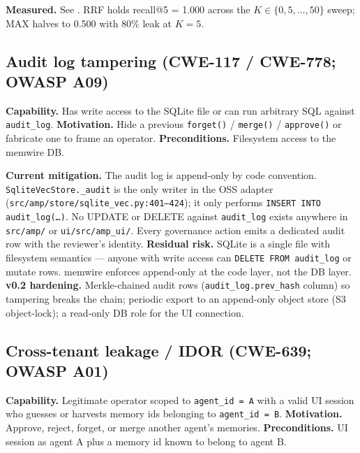 \documentclass[11pt,letterpaper,twocolumn]{article}
\begin{document}
\textbf{Measured.} See . RRF holds recall@5 = 1.000 across the $K \in \{0,5,\dots,50\}$ sweep; MAX halves to 0.500 with 80\% leak at $K=5$.

\subsection{Audit log tampering (CWE-117 / CWE-778; OWASP A09)}
\label{sec:threats-audit}

\textbf{Capability.} Has write access to the SQLite file or can run arbitrary SQL against \texttt{audit\_log}. \textbf{Motivation.} Hide a previous \texttt{forget()} / \texttt{merge()} / \texttt{approve()} or fabricate one to frame an operator. \textbf{Preconditions.} Filesystem access to the memwire DB.

\textbf{Current mitigation.} The audit log is append-only by code convention. \texttt{SqliteVecStore.\_audit} is the only writer in the OSS adapter (\texttt{src/amp/store/sqlite\_vec.py:401--424}); it only performs \texttt{INSERT INTO audit\_log(\ldots)}. No UPDATE or DELETE against \texttt{audit\_log} exists anywhere in \texttt{src/amp/} or \texttt{ui/src/amp\_ui/}. Every governance action emits a dedicated audit row with the reviewer's identity. \textbf{Residual risk.} SQLite is a single file with filesystem semantics --- anyone with write access can \texttt{DELETE FROM audit\_log} or mutate rows. memwire enforces append-only at the code layer, not the DB layer. \textbf{v0.2 hardening.} Merkle-chained audit rows (\texttt{audit\_log.prev\_hash} column) so tampering breaks the chain; periodic export to an append-only object store (S3 object-lock); a read-only DB role for the UI connection.

\subsection{Cross-tenant leakage / IDOR (CWE-639; OWASP A01)}
\label{sec:threats-idor}

\textbf{Capability.} Legitimate operator scoped to \texttt{agent\_id = A} with a valid UI session who guesses or harvests memory ids belonging to \texttt{agent\_id = B}. \textbf{Motivation.} Approve, reject, forget, or merge another agent's memories. \textbf{Preconditions.} UI session as agent A plus a memory id known to belong to agent B.
\end{document}
